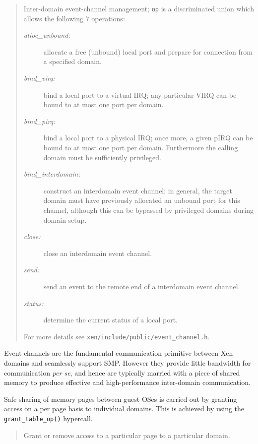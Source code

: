 \documentclass[11pt,twoside,final,openright]{xenstyle}
\begin{document}
\begin{quote}

Inter-domain event-channel management; {\tt op} is a discriminated 
union which allows the following 7 operations: 

\begin{description} 

\item[\it alloc\_unbound:] allocate a free (unbound) local
  port and prepare for connection from a specified domain. 
\item[\it bind\_virq:] bind a local port to a virtual 
IRQ; any particular VIRQ can be bound to at most one port per domain. 
\item[\it bind\_pirq:] bind a local port to a physical IRQ;
once more, a given pIRQ can be bound to at most one port per
domain. Furthermore the calling domain must be sufficiently
privileged.
\item[\it bind\_interdomain:] construct an interdomain event 
channel; in general, the target domain must have previously allocated 
an unbound port for this channel, although this can be bypassed by 
privileged domains during domain setup. 
\item[\it close:] close an interdomain event channel. 
\item[\it send:] send an event to the remote end of a 
interdomain event channel. 
\item[\it status:] determine the current status of a local port. 
\end{description} 

For more details see
{\tt xen/include/public/event\_channel.h}. 

\end{quote} 

Event channels are the fundamental communication primitive between 
Xen domains and seamlessly support SMP. However they provide little
bandwidth for communication {\sl per se}, and hence are typically 
married with a piece of shared memory to produce effective and 
high-performance inter-domain communication. 

Safe sharing of memory pages between guest OSes is carried out by
granting access on a per page basis to individual domains. This is
achieved by using the {\tt grant\_table\_op()} hypercall.

\begin{quote}

Grant or remove access to a particular page to a particular domain. 

\end{quote} 
\end{document}
